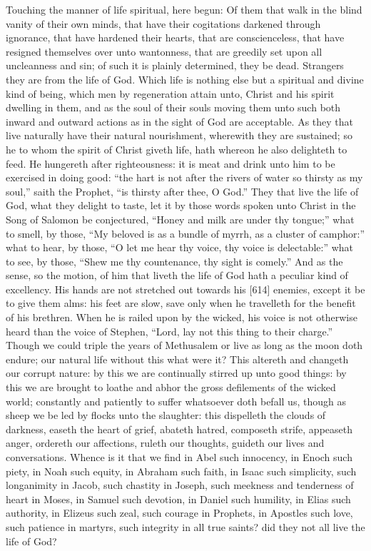 Touching the manner of life spiritual, here begun: Of them that walk in the blind vanity of their own minds, that have their cogitations darkened through ignorance, that have hardened their hearts, that are conscienceless, that have resigned themselves over unto wantonness, that are greedily set upon all uncleanness and sin; of such it is plainly determined, they be dead. Strangers they are from the life of God. Which life is nothing else but a spiritual and divine kind of being, which men by regeneration attain unto, Christ and his spirit dwelling in them, and as the soul of their souls moving them unto such both inward and outward actions as in the sight of God are acceptable. As they that live naturally have their natural nourishment, wherewith they are sustained; so he to whom the spirit of Christ giveth life, hath whereon he also delighteth to feed. He hungereth after righteousness: it is meat and drink unto him to be exercised in doing good: “the hart is not after the rivers of water so thirsty as my soul,” saith the Prophet, “is thirsty after thee, O God.” They that live the life of God, what they delight to taste, let it by those words spoken unto Christ in the Song of Salomon be conjectured, “Honey and milk are under thy tongue;” what to smell, by those, “My beloved is as a bundle of myrrh, as a cluster of camphor:” what to hear, by those, “O let me hear thy voice, thy voice is delectable:” what to see, by those, “Shew me thy countenance, thy sight is comely.” And as the sense, so the motion, of him that liveth the life of God hath a peculiar kind of excellency. His hands are not stretched out towards his [614] enemies, except it be to give them alms: his feet are slow, save only when he travelleth for the benefit of his brethren. When he is railed upon by the wicked, his voice is not otherwise heard than the voice of Stephen, “Lord, lay not this thing to their charge.” Though we could triple the years of Methusalem or live as long as the moon doth endure; our natural life without this what were it? This altereth and changeth our corrupt nature: by this we are continually stirred up unto good things: by this we are brought to loathe and abhor the gross defilements of the wicked world; constantly and patiently to suffer whatsoever doth befall us, though as sheep we be led by flocks unto the slaughter: this dispelleth the clouds of darkness, easeth the heart of grief, abateth hatred, composeth strife, appeaseth anger, ordereth our affections, ruleth our thoughts, guideth our lives and conversations. Whence is it that we find in Abel such innocency, in Enoch such piety, in Noah such equity, in Abraham such faith, in Isaac such simplicity, such longanimity in Jacob, such chastity in Joseph, such meekness and tenderness of heart in Moses, in Samuel such devotion, in Daniel such humility, in Elias such authority, in Elizeus such zeal, such courage in Prophets, in Apostles such love, such patience in martyrs, such integrity in all true saints? did they not all live the life of God?

